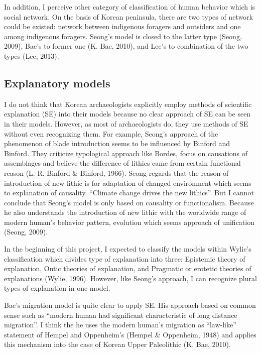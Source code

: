 \documentclass[american,man]{apa6}
\begin{document}
In addition, I perceive other category of classification of human
behavior which is social network. On the basis of Korean peninsula,
there are two types of network could be existed: network between
indigenous foragers and outsiders and one among indigenous foragers.
Seong's model is closed to the latter type (Seong, 2009), Bae's to
former one (K. Bae, 2010), and Lee's to combination of the two types
(Lee, 2013).

\subsection{Explanatory models}\label{explanatory-models}

I do not think that Korean archaeologists explicitly employ methods of
scientific explanation (SE) into their models because no clear approach
of SE can be seen in their models. However, as most of archaeologists
do, they use methods of SE without even recognizing them. For example,
Seong's approach of the phenomenon of blade introduction seems to be
influenced by Binford and Binford. They criticize typological approach
like Bordes, focus on causations of assemblages and believe the
difference of lithics came from certain functional reason (L. R. Binford
\& Binford, 1966). Seong regards that the reason of introduction of new
lithic is for adaptation of changed environment which seems to
explanation of causality. \enquote{Climate change drives the new
lithics}. But I cannot conclude that Seong's model is only based on
causality or functionalism. Because he also understands the introduction
of new lithic with the worldwide range of modern human's behavior
pattern, evolution which seems approach of unification (Seong, 2009).

In the beginning of this project, I expected to classify the models
within Wylie's classification which divides type of explanation into
three: Epistemic theory of explanation, Ontic theories of explanation,
and Pragmatic or erotetic theories of explanations (Wylie, 1996).
However, like Seong's approach, I can recognize plural types of
explanation in one model.

Bae's migration model is quite clear to apply SE. His approach based on
common sense such as \enquote{modern human had significant
characteristic of long distance migration}. I think the he uses the
modern human's migration as \enquote{law-like} statement of Hempel and
Oppenheim's (Hempel \& Oppenheim, 1948) and applies this mechanism into
the case of Korean Upper Paleolithic (K. Bae, 2010).
\end{document}
